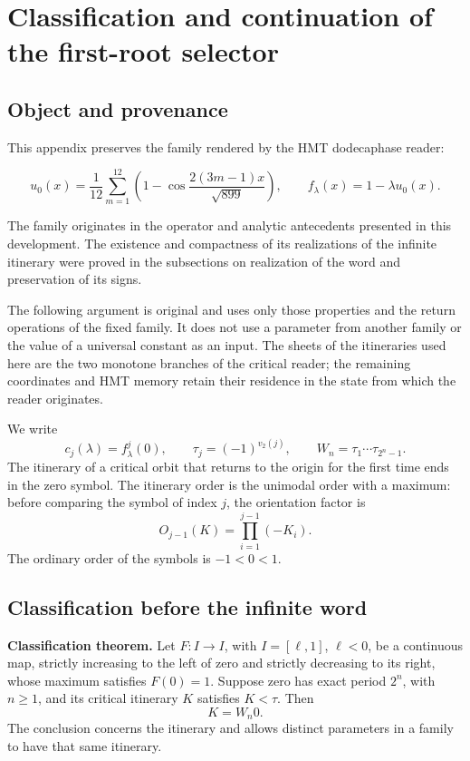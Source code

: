 \section{Classification and continuation of the first-root selector}
\label{hmtfg:fragmento:clasificacion-y-continuacion-del-selector-de-primeras-raices}

\subsection{Object and provenance}
\label{hmtfg:clasificacion:1}

This appendix preserves the family rendered by the HMT dodecaphase reader:

\[
u_0(x)=\frac1{12}\sum_{m=1}^{12}\left(1-\cos\frac{2(3m-1)x}{\sqrt{899}}\right),
\qquad f_\lambda(x)=1-\lambda u_0(x).
\]

The family originates in the operator and analytic antecedents presented in this development. The existence and compactness of its realizations of the infinite itinerary were proved in the subsections on realization of the word and preservation of its signs.

The following argument is original and uses only those properties and the return operations of the fixed family. It does not use a parameter from another family or the value of a universal constant as an input. The sheets of the itineraries used here are the two monotone branches of the critical reader; the remaining coordinates and HMT memory retain their residence in the state from which the reader originates.

We write
\[
c_j(\lambda)=f_\lambda^j(0),\qquad
\tau_j=(-1)^{v_2(j)},\qquad
W_n=\tau_1\cdots\tau_{2^n-1}.
\]
The itinerary of a critical orbit that returns to the origin for the first time ends in the zero symbol. The itinerary order is the unimodal order with a maximum: before comparing the symbol of index \(j\), the orientation factor is
\[
O_{j-1}(K)=\prod_{i=1}^{j-1}(-K_i).
\]
The ordinary order of the symbols is \(-1<0<1\).


\subsection{Classification before the infinite word}
\label{hmtfg:clasificacion:2}

\textbf{Classification theorem.} Let \(F:I\to I\), with \(I=[\ell,1]\), \(\ell<0\), be a continuous map, strictly increasing to the left of zero and strictly decreasing to its right, whose maximum satisfies \(F(0)=1\). Suppose zero has exact period \(2^n\), with \(n\ge1\), and its critical itinerary \(K\) satisfies \(K<\tau\). Then
\[
\boxed{K=W_n0.}
\]
The conclusion concerns the itinerary and allows distinct parameters in a family to have that same itinerary.

